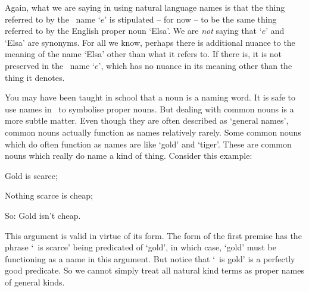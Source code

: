 Again, what we are saying in using natural language names is that the thing referred to by the \FOL\ name `$e$' is stipulated – for now – to be the same thing referred to by the English proper noun `Elsa'. We are \emph{not} saying that `$e$' and `Elsa' are synonyms. For all we know, perhaps there is additional nuance to the meaning of the name `Elsa' other than what it refers to. If there is, it is not preserved in the \FOL\ name `$e$', which has no nuance in its meaning other than the thing it denotes.

You may have been taught in school that a noun is a naming word. It is safe to use names in \FOL\ to symbolise proper nouns. But dealing with common nouns  is a more subtle matter. Even though they are often described as `general names', common nouns actually function as names relatively rarely. Some common nouns which do often function as names are  like `gold' and `tiger'. These are common nouns which really do name a kind of thing. Consider this example: \begin{earg}
	\item[] Gold is scarce;
	\item[] Nothing scarce is cheap;
	\item[So:] Gold isn't cheap.
\end{earg} This argument is valid in virtue of its form. The form of the first premise has the phrase `\blank\ is scarce' being predicated of `gold', in which case, `gold' must be functioning as a name in this argument. But notice that `\blank\ is gold' is a perfectly good predicate. So we cannot simply treat all natural kind terms as proper names of general kinds.  

